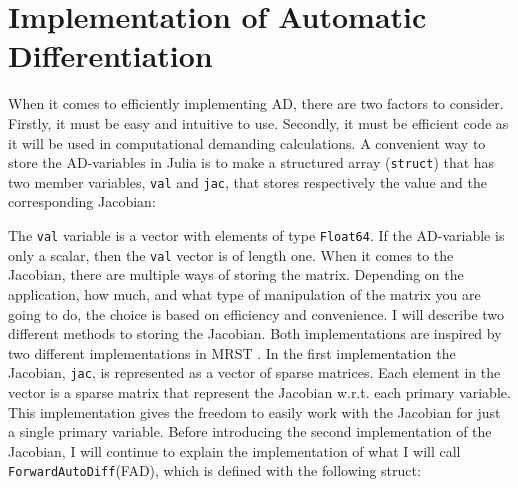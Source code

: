 \section{Implementation of Automatic Differentiation}
\label{sec:ImplementationAD}
When it comes to efficiently implementing AD, there are two factors to consider. Firstly, it must be easy and intuitive to use. Secondly, it must be efficient code as it will be used in computational demanding calculations. A convenient way to store the AD-variables in Julia is to make a structured array (\texttt{struct}) that has two member variables, \texttt{val} and \texttt{jac}, that stores respectively the value and the corresponding Jacobian: 
 
The \texttt{val} variable is a vector with elements of type \texttt{Float64}. If the AD-variable is only a scalar, then the \texttt{val} vector is of length one.  When it comes to the Jacobian, there are multiple ways of storing the matrix. Depending on the application, how much, and what type of manipulation of the matrix you are going to do, the choice is based on efficiency and convenience. I will describe two different methods to storing the Jacobian. Both implementations are inspired by two different implementations in MRST \emph{\citep{lieMrstUrl}}. In the first implementation the Jacobian, \texttt{jac}, is represented as a vector of sparse matrices. Each element in the vector is a sparse matrix that represent the Jacobian w.r.t. each primary variable. This implementation gives the freedom to easily work with the Jacobian for just a single primary variable. Before introducing the second implementation of the Jacobian, I will continue to explain the implementation of what I will call \texttt{ForwardAutoDiff}(FAD), which is defined with the following struct:



